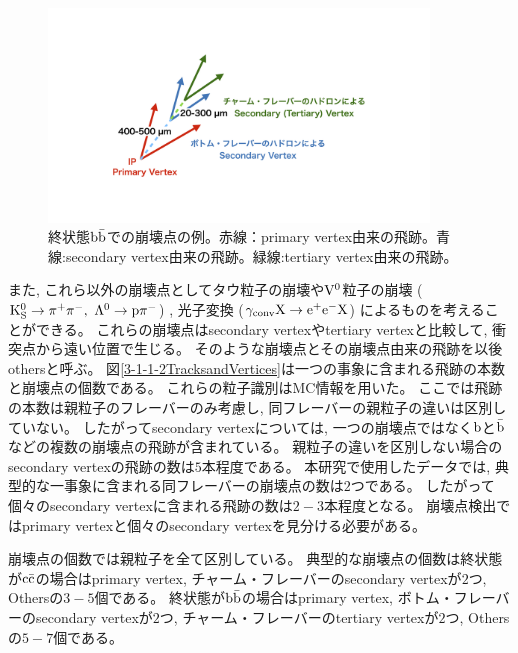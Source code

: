 \begin{figure}[htbp]
 \centering
 \includegraphics[trim = 200 200 200 200, width=0.9\textwidth, clip]{Figure/3Networks/3-1-1-1FinalStateBB.png}
 \caption[終状態$\rm b\bar{b}$での崩壊点の例]{終状態$\rm b\bar{b}$での崩壊点の例。赤線：primary vertex由来の飛跡。青線:secondary vertex由来の飛跡。緑線:tertiary vertex由来の飛跡。}
 \label{3-1-1-1FinalStateBB}
\end{figure}

また, これら以外の崩壊点としてタウ粒子の崩壊や$\rm V^0$粒子の崩壊 ($\rm K^0_S \to \pi^+\pi^-,\ \Lambda^0 \to p \pi^-$) , 光子変換 ($\rm \gamma_{conv} X \to e^+e^-X$) によるものを考えることができる。
これらの崩壊点はsecondary vertexやtertiary vertexと比較して, 衝突点から遠い位置で生じる。
そのような崩壊点とその崩壊点由来の飛跡を以後othersと呼ぶ。
図\ref{3-1-1-2TracksandVertices}は一つの事象に含まれる飛跡の本数と崩壊点の個数である。
これらの粒子識別はMC情報を用いた。
ここでは飛跡の本数は親粒子のフレーバーのみ考慮し, 同フレーバーの親粒子の違いは区別していない。
したがってsecondary vertexについては, 一つの崩壊点ではなく$\rm b$と$\rm \bar{b}$などの複数の崩壊点の飛跡が含まれている。
親粒子の違いを区別しない場合のsecondary vertexの飛跡の数は$5$本程度である。
本研究で使用したデータでは, 典型的な一事象に含まれる同フレーバーの崩壊点の数は$2$つである。
したがって個々のsecondary vertexに含まれる飛跡の数は$2-3$本程度となる。
崩壊点検出ではprimary vertexと個々のsecondary vertexを見分ける必要がある。

崩壊点の個数では親粒子を全て区別している。
典型的な崩壊点の個数は終状態が$\rm c\bar{c}$の場合はprimary vertex, チャーム・フレーバーのsecondary vertexが$2$つ, Othersの$3-5$個である。
終状態が$\rm b\bar{b}$の場合はprimary vertex, ボトム・フレーバーのsecondary vertexが$2$つ, チャーム・フレーバーのtertiary vertexが$2$つ, Othersの$5-7$個である。

